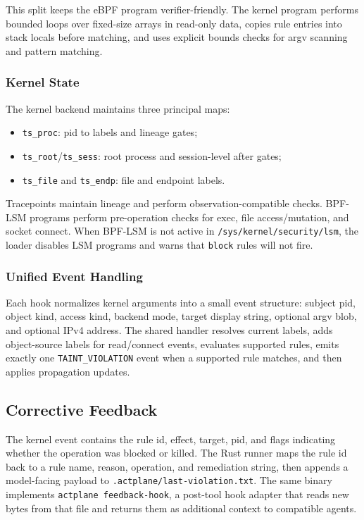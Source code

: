 This split keeps the eBPF program verifier-friendly. The kernel program performs
bounded loops over fixed-size arrays in read-only data, copies rule entries into
stack locals before matching, and uses explicit bounds checks for argv scanning
and pattern matching.

\subsubsection{Kernel State}

The kernel backend maintains three principal maps:

\begin{itemize}
\item \texttt{ts\_proc}: pid to labels and lineage gates;
\item \texttt{ts\_root}/\texttt{ts\_sess}: root process and session-level after
gates;
\item \texttt{ts\_file} and \texttt{ts\_endp}: file and endpoint labels.
\end{itemize}

Tracepoints maintain lineage and perform observation-compatible checks. BPF-LSM
programs perform pre-operation checks for exec, file access/mutation, and socket
connect. When BPF-LSM is not active in \texttt{/sys/kernel/security/lsm}, the
loader disables LSM programs and warns that \texttt{block} rules will not fire.

\subsubsection{Unified Event Handling}

Each hook normalizes kernel arguments into a small event structure: subject pid,
object kind, access kind, backend mode, target display string, optional argv
blob, and optional IPv4 address. The shared handler resolves current labels,
adds object-source labels for read/connect events, evaluates supported rules,
emits exactly one \texttt{TAINT\_VIOLATION} event when a supported rule matches,
and then applies propagation updates.

\subsection{Corrective Feedback}

The kernel event contains the rule id, effect, target, pid, and flags indicating
whether the operation was blocked or killed. The Rust runner maps the rule id
back to a rule name, reason, operation, and remediation string, then appends a
model-facing payload to \texttt{.actplane/last-violation.txt}. The same binary
implements \texttt{actplane feedback-hook}, a post-tool hook adapter that reads
new bytes from that file and returns them as additional context to compatible
agents.

